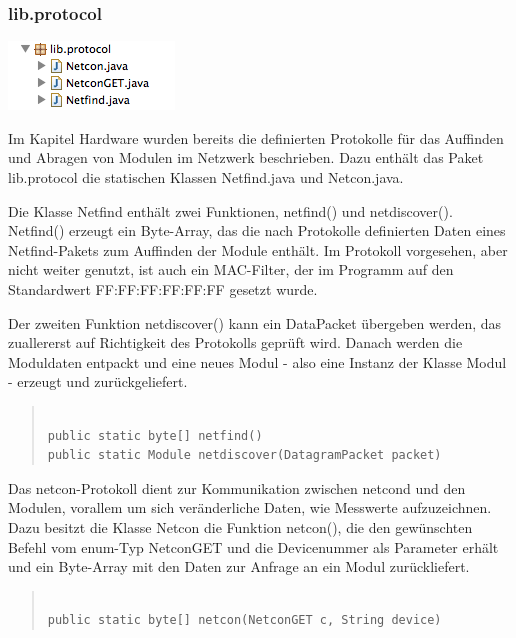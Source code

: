 \documentclass[a4paper,14pt,headsepline]{scrartcl}
\begin{document}
\subsubsection*{lib.protocol}

\includegraphics[width=0.2 \paperwidth]{./bilder/lib_protocol.png}

Im Kapitel Hardware wurden bereits die definierten Protokolle für das Auffinden und Abragen von Modulen im Netzwerk beschrieben. Dazu enthält das Paket lib.protocol die statischen Klassen Netfind.java und Netcon.java. 

Die Klasse Netfind enthält zwei Funktionen, netfind() und netdiscover(). Netfind() erzeugt ein Byte-Array, das die nach Protokolle definierten Daten eines Netfind-Pakets zum Auffinden der Module enthält. Im Protokoll vorgesehen, aber nicht weiter genutzt, ist auch ein MAC-Filter, der im Programm auf den Standardwert FF:FF:FF:FF:FF:FF gesetzt wurde. 

Der zweiten Funktion netdiscover() kann ein DataPacket übergeben werden, das zuallererst auf Richtigkeit des Protokolls geprüft wird. Danach werden die Moduldaten entpackt und eine neues Modul - also eine Instanz der Klasse Modul - erzeugt und zurückgeliefert.

\begin{quote}
\begin{verbatim}

public static byte[] netfind() 
public static Module netdiscover(DatagramPacket packet)

\end{verbatim}
\end{quote}

\newpage
Das netcon-Protokoll dient zur Kommunikation zwischen netcond und den Modulen, vorallem um sich veränderliche Daten, wie Messwerte aufzuzeichnen. Dazu besitzt die Klasse Netcon die Funktion netcon(), die den gewünschten Befehl vom enum-Typ NetconGET und die Devicenummer als Parameter erhält und ein Byte-Array mit den Daten zur Anfrage an ein Modul zurückliefert. 

\begin{quote}
\begin{verbatim}

public static byte[] netcon(NetconGET c, String device)

\end{verbatim}
\end{quote}
\end{document}
